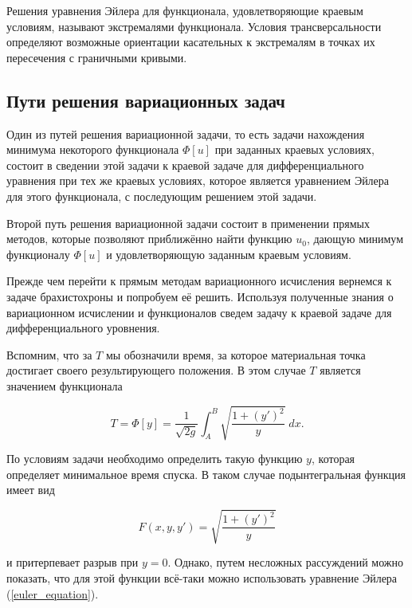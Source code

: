\documentclass{article}
\begin{document}
\begin{warn}[Важно!]
	Решения уравнения Эйлера для функционала, удовлетворяющие краевым условиям, называют экстремалями функционала. Условия трансверсальности определяют возможные ориентации касательных к экстремалям в точках их пересечения с граничными кривыми.
\end{warn}


\subsection{Пути решения вариационных задач}

Один из путей решения вариационной задачи, то есть задачи нахождения минимума некоторого функционала $\Phi[u]$ при заданных краевых условиях, состоит в сведении этой задачи к краевой задаче для дифференциального уравнения при тех же краевых условиях, которое является уравнением Эйлера для этого функционала, с последующим решением этой задачи.

Второй путь решения вариационной задачи состоит в применении прямых методов, которые позволяют приближённо найти функцию $u_{0}$, дающую минимум функционалу $\Phi[u]$ и удовлетворяющую заданным краевым условиям.

Прежде чем перейти к прямым методам вариационного исчисления вернемся к задаче брахистохроны и попробуем её решить. Используя полученные знания о вариационном исчислении и функционалов сведем задачу к краевой задаче для дифференциального уровнения.

Вспомним, что за $T$ мы обозначили время, за которое материальная точка достигает своего результирующего положения. В этом случае $T$ является значением функционала

\begin{displaymath}
	T = \Phi[y] = \frac{1}{\sqrt{2g}} \int_{A}^{B} \sqrt{\frac{1 + (y')^2}{y}} \; dx.
\end{displaymath}

\noindent По условиям задачи необходимо определить такую функцию $y$, которая определяет минимальное время спуска. В таком случае подынтегральная функция имеет вид

\begin{displaymath}
	F(x, y, y') = \sqrt{\frac{1 + (y')^2}{y}}
\end{displaymath}

\noindent и притерпевает разрыв при $y = 0$. Однако, путем несложных рассуждений можно показать, что для этой функции всё-таки можно использовать уравнение Эйлера (\ref{euler_equation}).
\end{document}
